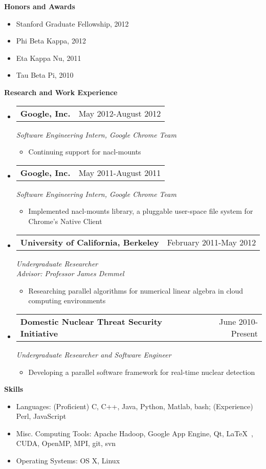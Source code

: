 \documentclass[letterpaper,11pt]{article}
\makeatletter
\newcommand{\resitem}[1]{\item #1 \vspace{-2pt}}
\newcommand{\desitem}[1]{\item #1 \vspace{-7pt}}
\newcommand{\resheading}[1]{{\large \colorbox{mygrey}{\begin{minipage}{\textwidth}{\textbf{#1 \vphantom{p\^{E}}}}\end{minipage}}}}
\newcommand{\expsubheading}[3]{
\begin{tabular*}{7.0in}{l@{\extracolsep{\fill}}r}
		\textbf{#1} & #2 \\
\end{tabular*}
\emph{#3}
\vspace{-6pt}
}
\makeatother
\begin{document}
\resheading{Honors and Awards}
\begin{itemize}
	\desitem{Stanford Graduate Fellowship, 2012}
	\desitem{Phi Beta Kappa, 2012}
	\desitem{Eta Kappa Nu, 2011}
	\desitem{Tau Beta Pi, 2010}
\end{itemize}

\vspace{0.1in}

\resheading{Research and Work Experience}
\begin{itemize}
\item
     \expsubheading{Google, Inc.}{May 2012-August 2012}{Software Engineering Intern, Google Chrome Team}
     \begin{itemize}
         \resitem{Continuing support for nacl-mounts}
     \end{itemize}
     
     \item
     \expsubheading{Google, Inc.}{May 2011-August 2011}{Software Engineering Intern, Google Chrome Team}
     \begin{itemize}
         \resitem{Implemented nacl-mounts library, a pluggable user-space file system for Chrome's Native Client}
     \end{itemize}

\item
   \expsubheading{University of California, Berkeley}{February 2011-May 2012}{Undergraduate Researcher \\
   Advisor: Professor James Demmel}
    \begin{itemize}
             \resitem{Researching parallel algorithms for numerical linear algebra in cloud computing environments}
     \end{itemize}
     
\item
    \expsubheading{Domestic Nuclear Threat Security Initiative}{June 2010-Present}{Undergraduate Researcher and Software Engineer}
    \begin{itemize}
         \resitem{Developing a parallel software framework for real-time nuclear detection}
     \end{itemize}    
     
\end{itemize}

\vspace{0.1in}

\resheading{Skills}
\begin{itemize}
    \desitem{Languages:
                    (Proficient) C, C++, Java, Python, Matlab, bash; (Experience) Perl, JavaScript}
    \desitem{Misc. Computing Tools:
                     Apache Hadoop, Google App Engine, Qt, \LaTeX\ , CUDA, OpenMP, MPI, git, svn}
    \desitem{Operating Systems:
                     OS X, Linux}
\end{itemize}
\end{document}
